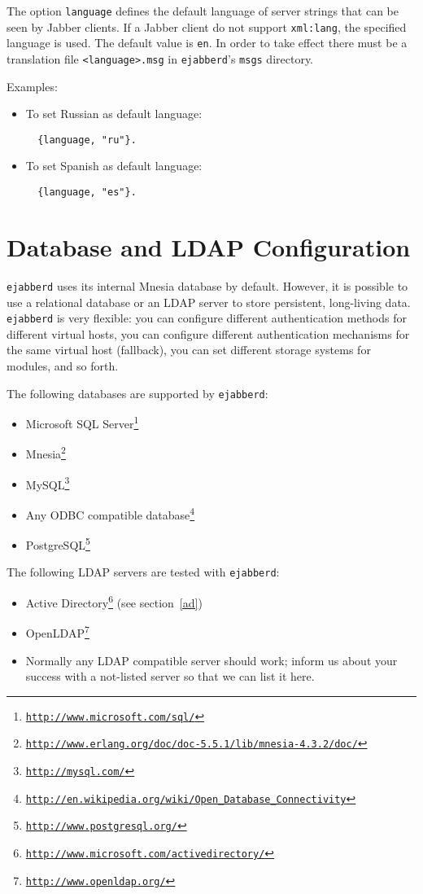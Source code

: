 \documentclass[a4paper,10pt]{book}
\newcommand{\ind}[1]{\begin{latexonly}\index{#1}\end{latexonly}}
\newcommand{\option}[1]{\texttt{#1}}
\newcommand{\term}[1]{\texttt{#1}}
\newcommand{\ejabberd}{\texttt{ejabberd}}
\newcommand{\Jabber}{Jabber}
\gdef\footahref#1#2{#2\footnote{\href{#1}{\texttt{#1}}}}
\begin{document}
The option \option{language} defines the default language of server strings that
can be seen by \Jabber{} clients. If a \Jabber{} client do not support
\option{xml:lang}, the specified language is used. The default value is
\term{en}. In order to take effect there must be a translation file
\term{<language>.msg} in \ejabberd{}'s \term{msgs} directory.

Examples:
\begin{itemize}
\item To set Russian as default language:
\begin{verbatim}
  {language, "ru"}.
\end{verbatim}
\item To set Spanish as default language:
\begin{verbatim}
  {language, "es"}.
\end{verbatim}
\end{itemize}

\section{Database and LDAP Configuration}
\label{database}
\ind{database}

\ejabberd{} uses its internal Mnesia database by default. However, it is
possible to use a relational database or an LDAP server to store persistent,
long-living data. \ejabberd{} is very flexible: you can configure different
authentication methods for different virtual hosts, you can configure different
authentication mechanisms for the same virtual host (fallback), you can set
different storage systems for modules, and so forth.

The following databases are supported by \ejabberd{}:
\begin{itemize}
\item \footahref{http://www.microsoft.com/sql/}{Microsoft SQL Server}
\item \footahref{http://www.erlang.org/doc/doc-5.5.1/lib/mnesia-4.3.2/doc/}{Mnesia}
\item \footahref{http://mysql.com/}{MySQL}
\item \footahref{http://en.wikipedia.org/wiki/Open\_Database\_Connectivity}{Any ODBC compatible database}
\item \footahref{http://www.postgresql.org/}{PostgreSQL}
\end{itemize}

The following LDAP servers are tested with \ejabberd{}:
\begin{itemize}
\item \footahref{http://www.microsoft.com/activedirectory/}{Active Directory}
  (see section~\ref{ad})
\item \footahref{http://www.openldap.org/}{OpenLDAP}
\item Normally any LDAP compatible server should work; inform us about your
  success with a not-listed server so that we can list it here.
\end{itemize}
\end{document}
